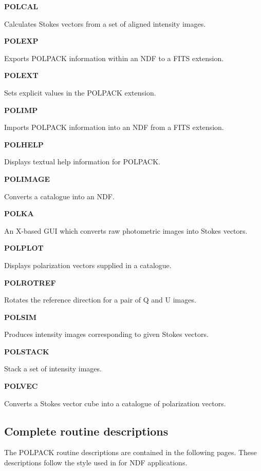 \documentclass[twoside,11pt]{starlink}
\providecommand{\quickdes}[3]{
                         \parbox{1.1in}{\textbf{#1}}
                         \parbox{4.4in}{\raggedright #2 \dotfill}
                         \parbox{0.6in}{\pageref{#3}}
                         \vspace*{0.2in}}
\begin{document}
\quickdes{POLCAL}{Calculates Stokes vectors from a set of aligned intensity images.}{POLCAL}

\quickdes{POLEXP}{Exports POLPACK information within an NDF to a FITS extension.}{POLEXP}

\quickdes{POLEXT}{Sets explicit values in the POLPACK extension.}{POLEXT}

\quickdes{POLIMP}{Imports POLPACK information into an NDF from a FITS
extension.}{POLEXP}

\quickdes{POLHELP}{Displays textual help information for POLPACK.}{POLHELP}

\quickdes{POLIMAGE}{Converts a catalogue into an NDF.}{POLIMAGE}

\quickdes{POLKA}{An X-based GUI which converts raw photometric images
into Stokes vectors.}{POLKA}

\quickdes{POLPLOT}{Displays polarization vectors supplied in a
catalogue.}{POLPLOT}

\quickdes{POLROTREF}{Rotates the reference direction for a pair of Q and
U images.}{POLROTREF}

\quickdes{POLSIM}{Produces intensity images corresponding to given Stokes
vectors.}{POLSIM}

\quickdes{POLSTACK}{Stack a set of intensity images.}{POLSTACK}

\quickdes{POLVEC}{Converts a Stokes vector cube into a catalogue of
polarization vectors.}{POLVEC}

\subsection{Complete routine descriptions \label{descriptions}}

The POLPACK routine descriptions are contained in the following pages.
These descriptions follow the style used in 
for NDF applications.
\end{document}
